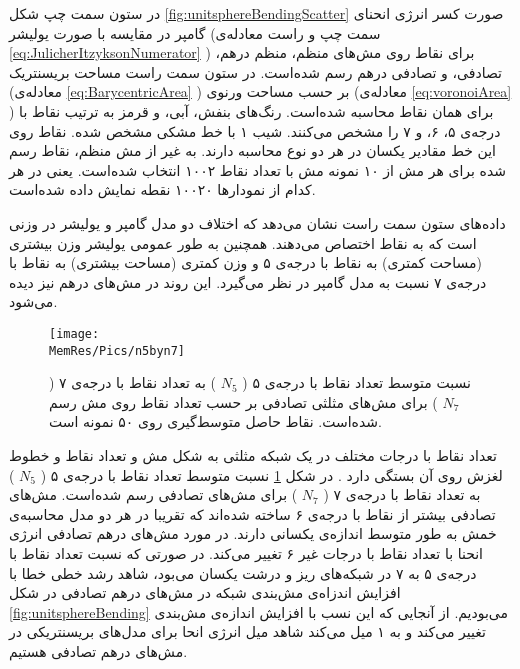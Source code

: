 در ستون سمت چپ شکل 
\ref{fig:unitsphereBendingScatter}
صورت کسر انرژی انحنای گامپر در مقایسه با صورت یولیشر (سمت چپ و راست معادله‌ی 
\ref{eq:JulicherItzyksonNumerator}
) برای نقاط روی مش‌های منظم، منظم درهم، تصادفی، و تصادفی درهم رسم شده‌است. در ستون سمت راست مساحت بریسنتریک (معادله‌ی 
\ref{eq:BarycentricArea}
) بر حسب مساحت ورنوی (معادله‌ی
\ref{eq:voronoiArea}
) برای همان نقاط محاسبه شده‌است. رنگ‌های بنفش، آبی،‌ و قرمز به ترتیب نقاط با درجه‌ی ۵، ۶، و ۷  را مشخص می‌کنند. شیب ۱ با خط مشکی مشخص شده. نقاط روی این خط مقادیر یکسان در هر دو نوع محاسبه دارند. به غیر از مش منظم،‌ نقاط رسم شده برای هر مش از ۱۰ نمونه مش با تعداد نقاط ۱۰۰۲ انتخاب شده‌است. یعنی در هر کدام از نمودارها ۱۰۰۲۰ نقطه نمایش داده شده‌است.

داده‌های ستون سمت راست نشان می‌دهد که اختلاف دو مدل گامپر و یولیشر  در  وزنی است که به نقاط اختصاص می‌دهند. همچنین به طور عمومی یولیشر وزن بیشتری (مساحت کمتری) به نقاط با درجه‌ی ۵ و وزن کمتری (مساحت بیشتری) به نقاط با درجه‌ی ۷ نسبت به مدل گامپر در نظر می‌گیرد. این روند در مش‌های درهم نیز دیده می‌شود.

\begin{figure}[htbp]
\begin{center}
\texttt{[image: \\MemRes/Pics/n5byn7]}
\caption{
نسبت متوسط تعداد نقاط با درجه‌ی ۵ (
$N_5$
) به تعداد نقاط با درجه‌ی ۷ (
$N_7$
) برای مش‌های مثلثی تصادفی بر حسب تعداد نقاط روی مش رسم شده‌است. نقاط حاصل متوسط‌گیری روی ۵۰ نمونه است.
}
\label{fig:n5n7}
\end{center}
\end{figure}


تعداد نقاط با درجات مختلف در یک شبکه مثلثی به شکل مش و تعداد نقاط  و خطوط لغزش روی آن بستگی دارد 
\cite{Nelson2000PRB}
. در شکل
\ref{fig:n5n7}
نسبت متوسط تعداد نقاط با درجه‌ی ۵ (
$N_5$
) به تعداد نقاط با درجه‌ی ۷ (
$N_7$
) برای مش‌های تصادفی رسم شده‌است. مش‌های تصادفی بیشتر از نقاط با درجه‌ی ۶ ساخته شده‌اند که تقریبا در هر دو مدل محاسبه‌ی خمش به طور متوسط اندازه‌ی یکسانی دارند. در مورد مش‌های درهم تصادفی انرژی انحنا با تعداد نقاط با درجات غیر ۶ تغییر می‌کند. در صورتی که نسبت تعداد نقاط با درجه‌ی ۵ به ۷ در شبکه‌های ریز و درشت یکسان می‌بود، شاهد رشد خطی خطا با افزایش اندزاه‌ی مش‌بندی شبکه‌ در مش‌های درهم تصادفی در شکل 
\ref{fig:unitsphereBending}
می‌بودیم. از آنجایی که این نسب با افزایش اندازه‌ی مش‌بندی تغییر می‌کند و به ۱ میل می‌کند شاهد میل‌ انرژی انحا برای مدل‌های بریسنتریکی در مش‌های درهم تصادفی هستیم.



